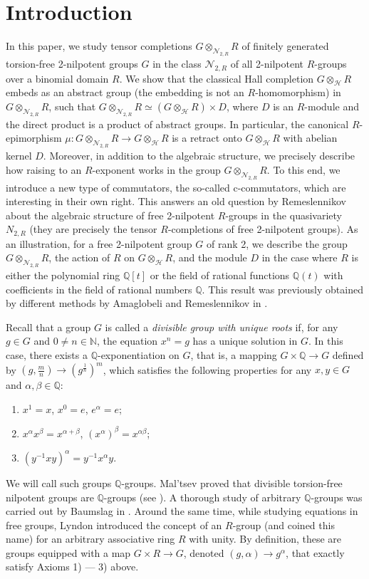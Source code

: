 \documentclass[11pt]{article}
\def\N{{\mathbb N}}
\def\Q{{\mathbb Q}}
\def\N{{\mathcal{N}}}
\theoremstyle{definition}
\begin{document}
\section{Introduction}
In this paper, we study tensor completions $G \otimes_{\N_{2,R}} R$ of finitely generated torsion-free 2-nilpotent groups $G$ in the class $\N_{2,R}$ of all 2-nilpotent $R$-groups over a binomial domain $R$. We show that the classical Hall completion $G\otimes_{\mathcal{H}} R$ embeds as an abstract group (the embedding is not an $R$-homomorphism) in $G \otimes_{\N_{2,R}} R$, such that $G\otimes_{\N_{2,R}} R \simeq (G \otimes_{\mathcal{H}} R) \times D$, where $D$ is an $R$-module and the direct product is a product of abstract groups. In particular, the canonical $R$-epimorphism $\mu: G \otimes_{\N_{2,R}} R \to G \otimes_{\mathcal{H}} R$ is a retract onto $G \otimes_{\mathcal{H}} R$ with abelian kernel $D$. Moreover, in addition to the algebraic structure, we precisely describe how raising to an $R$-exponent works in the group $G \otimes_{\N_{2,R}} R$. To this end, we introduce a new type of commutators, the so-called c-commutators, which are interesting in their own right. This answers an old question by Remeslennikov about the algebraic structure of free 2-nilpotent $R$-groups in the quasivariety $N_{2,R}$ (they are precisely the tensor $R$-completions of free 2-nilpotent groups). As an illustration, for a free 2-nilpotent group $G$ of rank 2, we describe the group $G \otimes_{\N_{2,R}} R$, the action of $R$ on $G \otimes_{\mathcal{H}} R$, and the module $D$ in the case where $R$ is either the polynomial ring $\mathbb{Q}[t]$ or the field of rational functions $\mathbb{Q}(t)$ with coefficients in the field of rational numbers $\mathbb{Q}$. This result was previously obtained by different methods by Amaglobeli and Remeslennikov in \cite{3}.

Recall that a group $G$ is called a \emph{divisible group with unique roots} if, for any $g \in G$ and $0 \neq n \in \mathbb{N}$, the equation $x^n = g$ has a unique solution in $G$. In this case, there exists a $\Q$-exponentiation on $G$, that is, a mapping $G\times \Q \to G$ defined by $(g,\frac{m}{n}) \to (g^{\frac{1}{n}})^m$, which satisfies the following properties for any $x,y \in G$ and $\alpha,\beta \in \Q$:
\begin{enumerate}
\item [1)] $x^1=x$, $x^0=e$, $e^\alpha=e$;
\item [2)] $x^\alpha x^\beta=x^{\alpha+\beta}$, $(x^\alpha)^\beta=x^{\alpha \beta}$;
\item [3)] $(y^{-1}xy)^\alpha=y^{-1}x^\alpha y$.
\end{enumerate}
We will call such groups $\Q$-groups. Mal'tsev proved that divisible torsion-free nilpotent groups are $\Q$-groups (see \cite{Malcev1,Malcev2}). A thorough study of arbitrary $\Q$-groups was carried out by Baumslag in \cite{Baumslag}. Around the same time, while studying equations in free groups, Lyndon \cite{1} introduced the concept of an $R$-group (and coined this name) for an arbitrary associative ring $R$ with unity. By definition, these are groups equipped with a map $G \times R \to G$, denoted $(g,\alpha) \to g^\alpha $, that exactly satisfy Axioms 1) --- 3) above.
\end{document}
